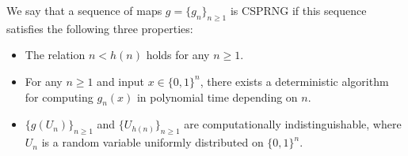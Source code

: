 We say that a sequence of maps $g =\{g_n\}_{n\geq 1}$ is CSPRNG if this sequence satisfies the following three properties:
\begin{itemize}
	\item The relation $n < h(n)$ holds for any $n\geq 1$.
	\item For any $n\geq 1$ and input $x\in \{0,1\}^n$, there exists a deterministic algorithm for computing $g_n(x)$ in polynomial time depending on $n$.
	\item $\{g(U_n)\}_{n\geq 1}$ and $\{U_{h(n)}\}_{n\geq 1}$ are computationally indistinguishable, where $U_n$ is a random variable uniformly distributed on $\{0,1\}^n$.
\end{itemize}

